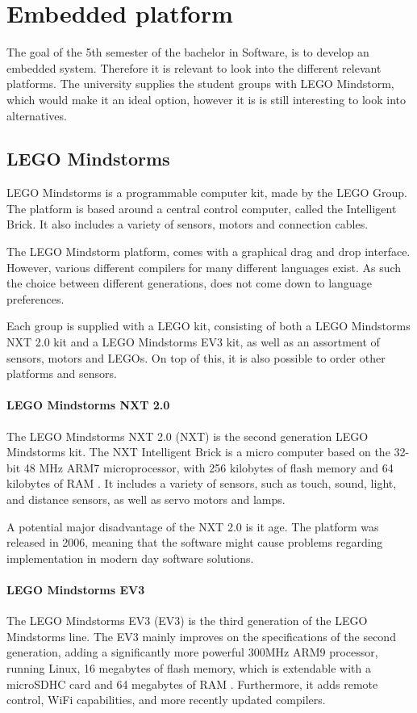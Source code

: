 \section{Embedded platform}
The goal of the 5th semester of the bachelor in Software, is to develop an embedded system.
Therefore it is relevant to look into the different relevant platforms.
The university supplies the student groups with LEGO Mindstorm, which would make it an ideal option, however it is is still interesting to look into alternatives.

\subsection{LEGO Mindstorms}
LEGO Mindstorms is a programmable computer kit, made by the LEGO Group.
The platform is based around a central control computer, called the Intelligent Brick.
It also includes a variety of sensors, motors and connection cables.

The LEGO Mindstorm platform, comes with a graphical drag and drop interface.
However, various different compilers for many different languages exist.
As such the choice between different generations, does not come down to language preferences.

Each group is supplied with a LEGO kit, consisting of both a LEGO Mindstorms NXT 2.0 kit and a LEGO Mindstorms EV3 kit, as well as an assortment of sensors, motors and LEGOs.
On top of this, it is also possible to order other platforms and sensors.

\paragraph{LEGO Mindstorms NXT 2.0}
The LEGO Mindstorms NXT 2.0 (NXT) is the second generation LEGO Mindstorms kit.
The NXT Intelligent Brick is a micro computer based on the 32-bit 48 MHz ARM7 microprocessor, with 256 kilobytes of flash memory and 64 kilobytes of RAM \cite{nxt2userguide} \cite{nxt2ev3compare}.
It includes a variety of sensors, such as touch, sound, light, and distance sensors, as well as servo motors and lamps.

A potential major disadvantage of the NXT 2.0 is it age.
The platform was released in 2006, meaning that the software might cause problems regarding implementation in modern day software solutions.

\paragraph{LEGO Mindstorms EV3}
The  LEGO Mindstorms EV3 (EV3) is the third generation of the LEGO Mindstorms line.
The EV3 mainly improves on the specifications of the second generation, adding a significantly more powerful 300MHz ARM9 processor, running Linux, 16 megabytes of flash memory, which is extendable with a microSDHC card and 64 megabytes of RAM \cite{ev3userguide}.
Furthermore, it adds remote control, WiFi capabilities, and more recently updated compilers.

